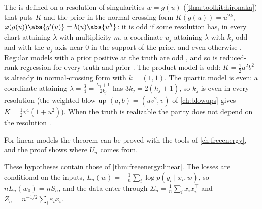 \begin{refsection}
The  is defined on a resolution of singularities $w=g(u)$ (\cref{thm:toolkit:hironaka}) that puts $K$ and the prior in the normal-crossing form $K(g(u))=u^{2k}$, $\varphi(g(u))\abs{g'(u)}=b(u)\abs{u^h}$: it is odd if some resolution has, in every chart attaining $\lambda$ with multiplicity $m$, a coordinate $u_j$ attaining $\lambda$ with $k_j$ odd and with the $u_j$-axis near $0$ in the support of the prior, and even otherwise \parencite[eq.~(17)]{Watanabe2013}. Regular models with a prior positive at the truth are odd \parencite[Lemma~3]{Watanabe2013}, and so is reduced-rank regression for every truth and prior \parencite[\S6.1]{Watanabe2013}. The product model is odd: $K=\frac12a^2b^2$ is already in normal-crossing form with $k=(1,1)$. The quartic model is even: a coordinate attaining $\lambda=\frac34=\frac{h_j+1}{2k_j}$ has $3k_j=2(h_j+1)$, so $k_j$ is even in every resolution (the weighted blow-up $(a,b)=(uv^2,v)$ of \cref{ch:blowups} gives $K=\frac12v^4(1+u^2)$). When the truth is realizable the parity does not depend on the resolution \parencite[Lemma~2]{Watanabe2013}.

For linear models the theorem can be proved with the tools of \cref{ch:freeenergy}, and the proof shows where $U_n$ comes from.


These hypotheses contain those of \cref{thm:freeenergy:linear}. The losses are conditional on the inputs, $L_n(w)=-\frac1n\sum_i\log p(y_i\mid x_i,w)$, so $nL_n(w_0)=nS_n$, and the data enter through $\Sigma_n=\frac1n\sum_ix_ix_i^\top$ and $Z_n=n^{-1/2}\sum_i\varepsilon_ix_i$.


\end{refsection}
